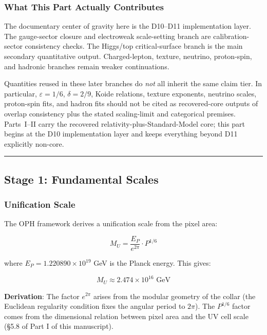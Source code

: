 \subsubsection{What This Part Actually Contributes}\label{1b4-what-oph-achieves}

The documentary center of gravity here is the D10--D11 implementation layer. The gauge-sector closure and electroweak scale-setting branch are calibration-sector consistency checks. The Higgs/top critical-surface branch is the main secondary quantitative output. Charged-lepton, texture, neutrino, proton-spin, and hadronic branches remain weaker continuations.

Quantities reused in these later branches do \emph{not} all inherit the same claim tier. In particular, \(\varepsilon=1/6\), \(\delta=2/9\), Koide relations, texture exponents, neutrino scales, proton-spin fits, and hadron fits should not be cited as recovered-core outputs of overlap consistency plus the stated scaling-limit and categorical premises. Parts~I--II carry the recovered relativity-plus-Standard-Model core; this part begins at the D10 implementation layer and keeps everything beyond D11 explicitly non-core.

\begin{center}\rule{0.5\linewidth}{0.5pt}\end{center}

\subsection{Stage 1: Fundamental Scales}\label{2-stage-1-fundamental-scales}

\subsubsection{Unification Scale}\label{21-unification-scale}

The OPH framework derives a unification scale from the pixel area:

\[M_U = \frac{E_P}{e^{2\pi}} \cdot P^{1/6}\]

where \(E_P = 1.220890 \times 10^{19}\) GeV is the Planck energy. This gives:

\[M_U \approx 2.474 \times 10^{16} \text{ GeV}\]

\textbf{Derivation}: The factor \(e^{2\pi}\) arises from the modular geometry of the collar (the Euclidean regularity condition fixes the angular period to \(2\pi\)). The \(P^{1/6}\) factor comes from the dimensional relation between pixel area and the UV cell scale (\S{}5.8 of Part I of this manuscript).

